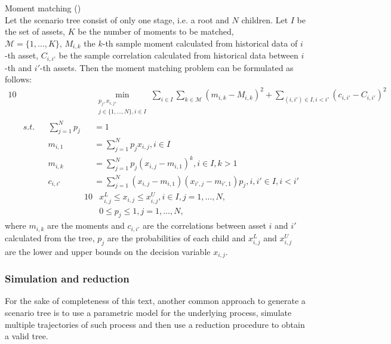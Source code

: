 \begin{defn}{\normalfont Moment matching} \label{defn:moment_matching_method}
{\normalfont (\cite[p. 9]{moment_matching_agarwal})}
\\
Let the scenario tree consist of only one stage, i.e. a root and $N$ children. Let $I$ be the set of assets, $K$ be the number of moments to be matched, \\ $\mathcal{M}=\{1,\dots,K\}$, $M_{i,k}$ the $k$-th sample moment calculated from historical data of $i$-th asset, $C_{i,i'}$ be the sample correlation calculated from historical data between $i$-th and $i'$-th assets. Then the moment matching problem can be formulated as follows:
\begin{alignat}{10}
& && && \underset{\substack{p_j, x_{i,j}, \\ j \in \{1,...,N\}, i \in I}}{\min} \sum_{i\in I} \sum_{k\in \mathcal{M}} \left(m_{i,k} - M_{i,k}\right)^2 + \sum_{(i, i') \in I, i < i'}(c_{i,i'}-C_{i,i'})^2 \nonumber \\
& s.t. && \sum_{j=1}^N p_j&&=1 \nonumber \\
& && m_{i,1}&&=\sum_{j=1}^N p_jx_{i,j}, i \in I \nonumber \\
& && m_{i,k}&&=\sum_{j=1}^N p_j(x_{i,j}-m_{i,1})^k, i \in I, k>1 \nonumber \\
& && c_{i,i'}&&=\sum_{j=1}^N(x_{i,j}-m_{i,1})(x_{i',j}-m_{i',1})p_j, i,i' \in I, i<i' \nonumber
\end{alignat}
\vspace{-0.5cm}
\begin{alignat}{10}
& x_{i,j}^L \leq x_{i,j} \leq x_{i,j}^U, i \in I, j=1,\dots,N, \nonumber \\
& 0 \leq p_j \leq 1, j=1,\dots,N, \nonumber
\end{alignat}
where $m_{i,k}$ are the moments and $c_{i,i'}$ are the correlations between asset $i$ and $i'$ calculated from the tree, $p_j$ are the probabilities of each child and $x_{i,j}^L$ and $x_{i,j}^U$ are the lower and upper bounds on the decision variable $x_{i,j}$.
\end{defn}


\subsubsection{Simulation and reduction}
For the sake of completeness of this text, another common approach to generate a scenario tree is to use a parametric model for the underlying process, simulate multiple trajectories of such process and then use a reduction procedure to obtain a valid tree. 

